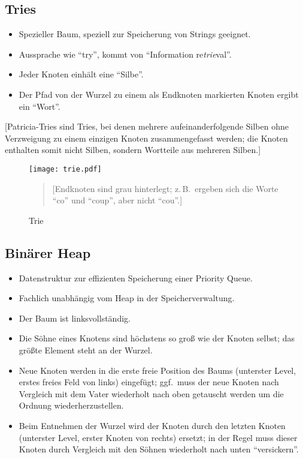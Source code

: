 \subsection{Tries}
\begin{itemize}
  \item Spezieller Baum, speziell zur Speicherung von Strings geeignet.
  \item Aussprache wie \enquote{try}, kommt von \enquote{Information re\emph{trie}val}.
  \item Jeder Knoten einhält eine \enquote{Silbe}.
  \item Der Pfad von der Wurzel zu einem als Endknoten markierten Knoten ergibt ein \enquote{Wort}.
\end{itemize}
[Patricia-Tries sind Tries, bei denen mehrere aufeinanderfolgende Silben ohne Verzweigung zu einem einzigen Knoten zusammengefasst werden; die Knoten enthalten somit nicht Silben, sondern Wortteile aus mehreren Silben.]
\begin{figure}[htb]
\centering\texttt{[image: trie.pdf]}

\begin{quote}
    \small[Endknoten sind grau hinterlegt; z.\,B.~ergeben sich die Worte \enquote{co} und \enquote{coup}, aber nicht \enquote{cou}.]
\end{quote}

\caption{Trie}
\end{figure}


\subsection{\label{subsection:binheap}Binärer Heap}
\begin{itemize}
  \item Datenstruktur zur effizienten Speicherung einer Priority Queue.
  \item Fachlich unabhängig vom Heap in der Speicherverwaltung.
  \item Der Baum ist linksvollständig.
  \item Die Söhne eines Knotens sind höchstens so groß wie der Knoten selbst; das größte Element steht an der Wurzel.
  \item Neue Knoten werden in die erste freie Position des Baums (unterster Level, erstes freies Feld von links) eingefügt; ggf.~muss der neue Knoten nach Vergleich mit dem Vater wiederholt nach oben getauscht werden um die Ordnung wiederherzustellen.
  \item Beim Entnehmen der Wurzel wird der Knoten durch den letzten Knoten (unterster Level, erster Knoten von rechts) ersetzt; in der Regel muss dieser Knoten durch Vergleich mit den Söhnen wiederholt nach unten \enquote{versickern}.
\end{itemize}


